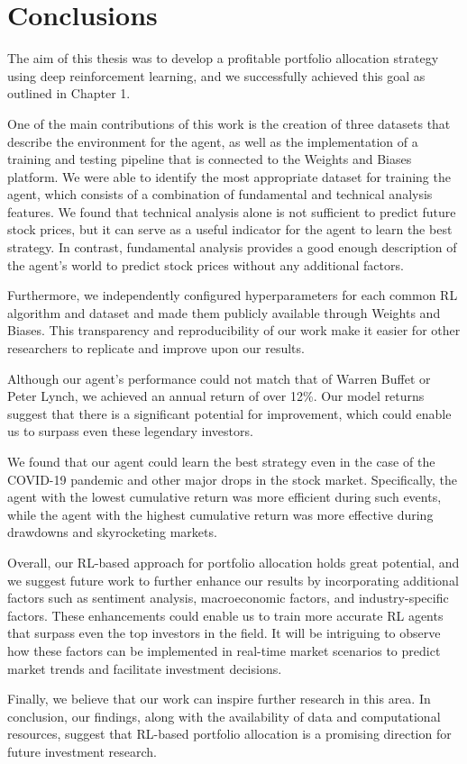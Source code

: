 \documentclass[../xlapes02]{subfiles}
\begin{document}
    \chapter{Conclusions}\label{sec:conclusions}
    The aim of this thesis was to develop a profitable portfolio allocation strategy using deep reinforcement learning, and we successfully achieved this goal as outlined in Chapter 1.

    One of the main contributions of this work is the creation of three datasets that describe the environment for the agent, as well as the implementation of a training and testing pipeline that is connected to the Weights and Biases platform. We were able to identify the most appropriate dataset for training the agent, which consists of a combination of fundamental and technical analysis features. We found that technical analysis alone is not sufficient to predict future stock prices, but it can serve as a useful indicator for the agent to learn the best strategy. In contrast, fundamental analysis provides a good enough description of the agent's world to predict stock prices without any additional factors.

    Furthermore, we independently configured hyperparameters for each common RL algorithm and dataset and made them publicly available through Weights and Biases. This transparency and reproducibility of our work make it easier for other researchers to replicate and improve upon our results.

    Although our agent's performance could not match that of Warren Buffet or Peter Lynch, we achieved an annual return of over 12\%. Our model returns suggest that there is a significant potential for improvement, which could enable us to surpass even these legendary investors.

    We found that our agent could learn the best strategy even in the case of the COVID-19 pandemic and other major drops in the stock market. Specifically, the agent with the lowest cumulative return was more efficient during such events, while the agent with the highest cumulative return was more effective during drawdowns and skyrocketing markets.

    Overall, our RL-based approach for portfolio allocation holds great potential, and we suggest future work to further enhance our results by incorporating additional factors such as sentiment analysis, macroeconomic factors, and industry-specific factors. These enhancements could enable us to train more accurate RL agents that surpass even the top investors in the field. It will be intriguing to observe how these factors can be implemented in real-time market scenarios to predict market trends and facilitate investment decisions.

    Finally, we believe that our work can inspire further research in this area. In conclusion, our findings, along with the availability of data and computational resources, suggest that RL-based portfolio allocation is a promising direction for future investment research.
\end{document}
